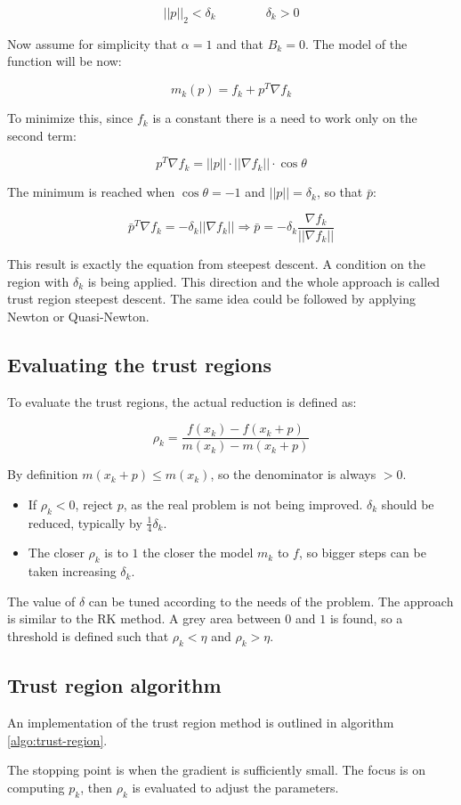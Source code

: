   $$||p||_2<\delta_k\qquad\qquad \delta_k > 0$$

  Now assume for simplicity that $\alpha = 1$ and that $B_k = 0$.
  The model of the function will be now:

  $$m_k(p) = f_k + p^T\nabla f_k$$

  To minimize this, since $f_k$ is a constant there is a need to work only on the second term:

  $$p^T\nabla f_k = ||p||\cdot||\nabla f_k||\cdot \cos\theta$$

  The minimum is reached when $\cos\theta = -1$ and $||p|| = \delta_k$, so that $\bar{p}$:

  $$\bar{p}^T\nabla f_k = -\delta_k||\nabla f_k||\Rightarrow \bar{p} = -\delta_k\frac{\nabla f_k}{||\nabla f_k||}$$

  This result is exactly the equation from steepest descent.
  A condition on the region with $\delta_k$ is being applied.
  This direction and the whole approach is called trust region steepest descent.
  The same idea could be followed by applying Newton or Quasi-Newton.

  \subsection{Evaluating the trust regions}
  To evaluate the trust regions, the actual reduction is defined as:

  $$\rho_k = \frac{f(x_k)-f(x_k+p)}{m(x_k)-m(x_k+p)}$$

  By definition $m(x_k+p) \leq m(x_k)$, so the denominator is always $>0$.

  \begin{multicols}{2}
    \begin{itemize}
      \item If $\rho_k < 0$, reject $p$, as the real problem is not being improved.
        $\delta_k$ should be reduced, typically by $\frac{1}{4} \delta_k$.
      \item The closer $\rho_k$ is to $1$ the closer the model $m_k$ to $f$, so bigger steps can be taken increasing $\delta_k$.
    \end{itemize}
  \end{multicols}

  The value of $\delta$ can be tuned according to the needs of the problem.
  The approach is similar to  the RK method.
  A grey area  between $0$ and $1$ is found, so a threshold is defined such that $\rho_k < \eta$ and $\rho_k > \eta$.


  \subsection{Trust region algorithm}
  An implementation of the trust region method is outlined in algorithm \ref{algo:trust-region}.

  

  The stopping point is when the gradient is sufficiently small.
  The focus is on computing $p_k$, then $\rho_k$ is evaluated to adjust the parameters.
